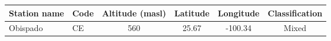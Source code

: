 \begin{table}[H]
    \begin{tabular}{llcccc} \hline
        Station name   & Code & Altitude (masl) & Latitude & Longitude & Classification  \\ \hline
        Obispado       & CE   & 560             & 25.67    & -100.34   & Mixed           \\

\end{tabular}
\end{table}
